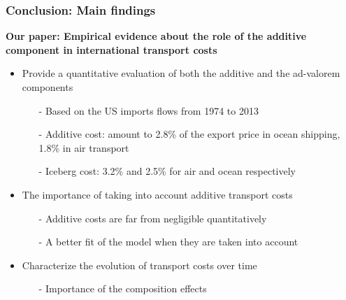 \documentclass[10 pt,Helvetica, french]{beamer}
\begin{document}
\begin{frame}
\frametitle{Conclusion: Main findings}
\textbf{Our paper: Empirical evidence about the role of the additive component in international transport costs} \vspace{0.1cm}
\begin{itemize}
\item Provide a quantitative evaluation of both the additive and the ad-valorem components \vspace{0.1cm}
\begin{itemize}
\item[-] Based on the US imports flows from 1974 to 2013 \vspace{0.1cm}
\item[-] Additive cost: amount to 2.8\% of the export price in ocean shipping, 1.8\% in air transport \vspace{0.1cm}
\item[-] Iceberg cost: 3.2\% and 2.5\% for air and ocean respectively \vspace{0.1cm}
\end{itemize}
\item The importance of taking into account additive transport costs \vspace{0.1cm}
\begin{itemize}
\item[-] Additive costs are far from negligible quantitatively \vspace{0.1cm}
\item[-] A better fit of the model when they are taken into account    \vspace{0.1cm}
\end{itemize}
\item Characterize the evolution of transport costs over time \vspace{0.1cm}
\begin{itemize}
\item[-] Importance of the composition effects \vspace{0.1cm}
\end{itemize}
\end{itemize}

\end{frame}
\end{document}
